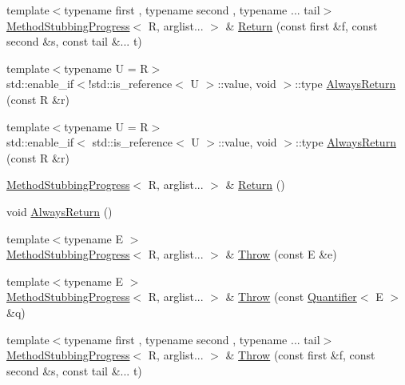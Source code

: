 \begin{DoxyCompactItemize}
{\footnotesize template$<$typename first , typename second , typename ... tail$>$ }\\\mbox{\hyperlink{structfakeit_1_1MethodStubbingProgress}{Method\+Stubbing\+Progress}}$<$ R, arglist... $>$ \& \mbox{\hyperlink{structfakeit_1_1MethodStubbingProgress_ae8417ec5f29f70be1ae914755b05e4db}{Return}} (const first \&f, const second \&s, const tail \&... t)
\item 
{\footnotesize template$<$typename U  = R$>$ }\\std\+::enable\+\_\+if$<$!std\+::is\+\_\+reference$<$ U $>$\+::value, void $>$\+::type \mbox{\hyperlink{structfakeit_1_1MethodStubbingProgress_a268ca122b518c0a34e80535d8f457549}{Always\+Return}} (const R \&r)
\item 
{\footnotesize template$<$typename U  = R$>$ }\\std\+::enable\+\_\+if$<$ std\+::is\+\_\+reference$<$ U $>$\+::value, void $>$\+::type \mbox{\hyperlink{structfakeit_1_1MethodStubbingProgress_a84cf6a4bf307cf8d49efb69b014e9b11}{Always\+Return}} (const R \&r)
\item 
\mbox{\hyperlink{structfakeit_1_1MethodStubbingProgress}{Method\+Stubbing\+Progress}}$<$ R, arglist... $>$ \& \mbox{\hyperlink{structfakeit_1_1MethodStubbingProgress_a4743b7e25e98cd6a2be2c03b7a9416d4}{Return}} ()
\item 
void \mbox{\hyperlink{structfakeit_1_1MethodStubbingProgress_a3f1ecf87f8c73b7f3276786914579f8b}{Always\+Return}} ()
\item 
{\footnotesize template$<$typename E $>$ }\\\mbox{\hyperlink{structfakeit_1_1MethodStubbingProgress}{Method\+Stubbing\+Progress}}$<$ R, arglist... $>$ \& \mbox{\hyperlink{structfakeit_1_1MethodStubbingProgress_ae3da30d02ba5de4bfa82f51bba5602c3}{Throw}} (const E \&e)
\item 
{\footnotesize template$<$typename E $>$ }\\\mbox{\hyperlink{structfakeit_1_1MethodStubbingProgress}{Method\+Stubbing\+Progress}}$<$ R, arglist... $>$ \& \mbox{\hyperlink{structfakeit_1_1MethodStubbingProgress_a93c74210adfc0ec4662aff15f78834c7}{Throw}} (const \mbox{\hyperlink{structfakeit_1_1Quantifier}{Quantifier}}$<$ E $>$ \&q)
\item 
{\footnotesize template$<$typename first , typename second , typename ... tail$>$ }\\\mbox{\hyperlink{structfakeit_1_1MethodStubbingProgress}{Method\+Stubbing\+Progress}}$<$ R, arglist... $>$ \& \mbox{\hyperlink{structfakeit_1_1MethodStubbingProgress_a516a0ade529c61e4ab6df1bf47f3f1b2}{Throw}} (const first \&f, const second \&s, const tail \&... t)

\end{DoxyCompactItemize}

